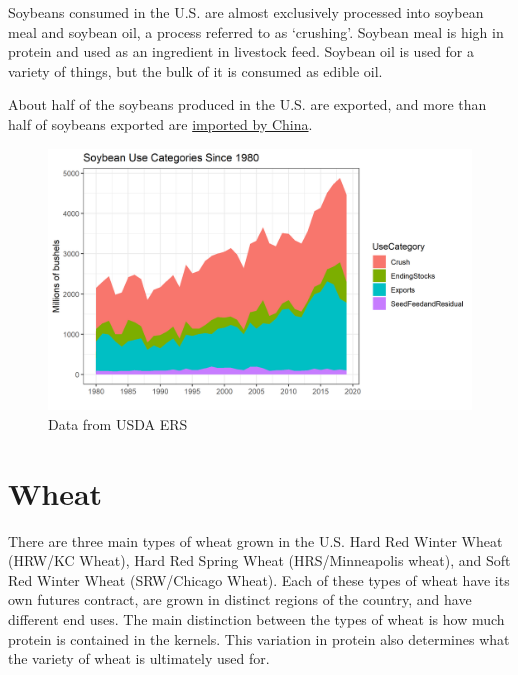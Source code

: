 \documentclass[
  letterpaper,
  DIV=11,
  numbers=noendperiod]{scrreprt}
\begin{document}
Soybeans consumed in the U.S. are almost exclusively processed into
soybean meal and soybean oil, a process referred to as `crushing'.
Soybean meal is high in protein and used as an ingredient in livestock
feed. Soybean oil is used for a variety of things, but the bulk of it is
consumed as edible oil.

About half of the soybeans produced in the U.S. are exported, and more
than half of soybeans exported are
\href{http://farmdocdaily.illinois.edu/2015/03/footprint-of-chinese-demand-for-us-soybeans.html}{imported
by China}.

\begin{figure}

{\centering \includegraphics{assets/PrimerforGrain_SoyUse.png}

}

\caption{Data from USDA ERS}

\end{figure}

\hypertarget{wheat}{%
\section{Wheat}\label{wheat}}

There are three main types of wheat grown in the U.S. Hard Red Winter
Wheat (HRW/KC Wheat), Hard Red Spring Wheat (HRS/Minneapolis wheat), and
Soft Red Winter Wheat (SRW/Chicago Wheat). Each of these types of wheat
have its own futures contract, are grown in distinct regions of the
country, and have different end uses. The main distinction between the
types of wheat is how much protein is contained in the kernels. This
variation in protein also determines what the variety of wheat is
ultimately used for.
\end{document}
